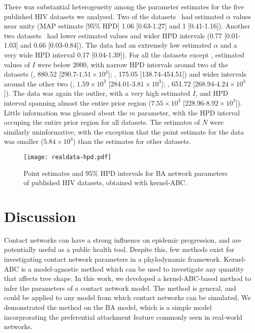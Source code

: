 \documentclass[12pt]{article}\usepackage[]{graphicx}\usepackage[]{color}
\begin{document}
There was substantial heterogeneity among the parameter estimates for the five
published HIV datasets we analysed. Two of the
datasets~\autocite{niculescu2015recent, wang2015targeting} had estimated
$\alpha$ values near unity (\gls{MAP} estimate [95\% \gls{HPD}] 
  1.06 
  [0.63-1.27]
and
  1 
  [0.41-1.16]). Another two
datasets~\autocite{li2015hiv, cuevas2009hiv} had lower estimated values and wider
\gls{HPD} intervals
  (0.77 
  [0.01-1.03]
and
  0.66 
  [0.03-0.84]). 
The \textcite{novitsky2014impact} data had an extremely low estimated $\alpha$
and a very wide \gls{HPD} interval
  0.17 
  [0.04-1.39]). 
For all the datasets except \textcite{novitsky2014impact}, estimated values of
$I$ were below 2000, with narrow \gls{HPD} intervals around two of the
datasets
  (\textcite{cuevas2009hiv}, 880.52 
  [290.7-\ensuremath{1.51\times 10^{3}}];
   \textcite{niculescu2015recent}, 175.05
  [138.74-454.51])
and wider intervals around the other two
  (\textcite{li2015hiv}, \ensuremath{1.59\times 10^{3}} 
  [284.01-\ensuremath{3.81\times 10^{3}}];
   \textcite{wang2015targeting}, 651.72
  [268.94-\ensuremath{4.24\times 10^{3}}]).
The \textcite{novitsky2014impact} data was again the outlier, with a very high
estimated $I$, and \gls{HPD} interval spanning almost the entire prior region
  (\ensuremath{7.55\times 10^{3}} 
  [228.96-\ensuremath{8.92\times 10^{3}}]).
Little information was gleaned about the $m$ parameter, with the \gls{HPD}
interval occuping the entire prior region for all datasets. The estimates of
$N$ were similarly uninformative, with the exception that the point estimate
for the \textcite{wang2015targeting} data was smaller
  (\ensuremath{5.84\times 10^{3}})
than the estimates for other datasets.

\begin{figure}[ht]
  \centering
  \texttt{[image: realdata-hpd.pdf]}
  \caption{
    Point estimates and 95\% \gls{HPD} intervals for \gls{BA} network
    parameters of published HIV datasets, obtained with kernel-ABC.
  }
\end{figure}

\section*{Discussion}

Contact networks can have a strong influence on epidemic progression, and are
potentially useful as a public health tool. Despite this, few methods exist for
investigating contact network parameters in a phylodynamic framework.
Kernel-ABC is a model-agnostic method which can be used to investigate any
quantity that affects tree shape. In this work, we developed a kernel-ABC-based
method to infer the parameters of a contact network model. The method is
general, and could be applied to any model from which contact networks can be
simulated. We demonstrated the method on the \gls{BA} model, which is a simple 
model incorprorating the preferential attachment feature commonly seen in
real-world networks. 
\end{document}
